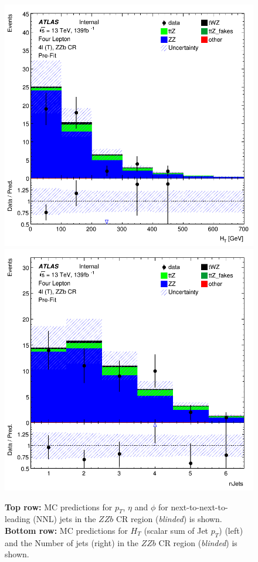 \begin{figure}[htbp]
    \includegraphics[width=.3\textwidth]{figures/PreFitPlots/lep4_ZZb_4T_HT.png}   \quad
    \includegraphics[width=.3\textwidth]{figures/PreFitPlots/lep4_ZZb_4T_Num_Jets.png}

    \caption{\textbf{Top row:} MC predictions for $p_{T}$, $\eta$ and $\phi$ for next-to-next-to-leading (NNL) jets in the $ZZb$ CR region (\textit{blinded}) is shown. \textbf{Bottom row:} MC predictions for $H_{T}$ (scalar sum of Jet $p_{T}$) (left) and the Number of jets (right) in the $ZZb$ CR region (\textit{blinded}) is shown.}
    \label{fig:4lep-ZZb-CR-NNLjetPlots} 
\end{figure}



